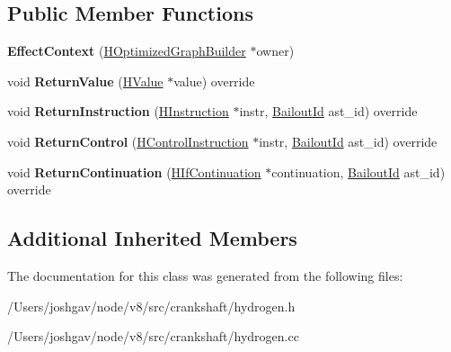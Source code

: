 \subsection*{Public Member Functions}
\begin{DoxyCompactItemize}
\item 
{\bfseries Effect\+Context} (\hyperlink{classv8_1_1internal_1_1_h_optimized_graph_builder}{H\+Optimized\+Graph\+Builder} $\ast$owner)\hypertarget{classv8_1_1internal_1_1_effect_context_aaf67bb6bbb84cbec46dd1d3e621864ed}{}\label{classv8_1_1internal_1_1_effect_context_aaf67bb6bbb84cbec46dd1d3e621864ed}

\item 
void {\bfseries Return\+Value} (\hyperlink{classv8_1_1internal_1_1_h_value}{H\+Value} $\ast$value) override\hypertarget{classv8_1_1internal_1_1_effect_context_a8bfa0667ee2f87add85ba129d06aed73}{}\label{classv8_1_1internal_1_1_effect_context_a8bfa0667ee2f87add85ba129d06aed73}

\item 
void {\bfseries Return\+Instruction} (\hyperlink{classv8_1_1internal_1_1_h_instruction}{H\+Instruction} $\ast$instr, \hyperlink{classv8_1_1internal_1_1_bailout_id}{Bailout\+Id} ast\+\_\+id) override\hypertarget{classv8_1_1internal_1_1_effect_context_a5b67c5fdcf330817fd813adac4245250}{}\label{classv8_1_1internal_1_1_effect_context_a5b67c5fdcf330817fd813adac4245250}

\item 
void {\bfseries Return\+Control} (\hyperlink{classv8_1_1internal_1_1_h_control_instruction}{H\+Control\+Instruction} $\ast$instr, \hyperlink{classv8_1_1internal_1_1_bailout_id}{Bailout\+Id} ast\+\_\+id) override\hypertarget{classv8_1_1internal_1_1_effect_context_a6dc5fda1ffff8de8cb39afb13df888e4}{}\label{classv8_1_1internal_1_1_effect_context_a6dc5fda1ffff8de8cb39afb13df888e4}

\item 
void {\bfseries Return\+Continuation} (\hyperlink{classv8_1_1internal_1_1_h_if_continuation}{H\+If\+Continuation} $\ast$continuation, \hyperlink{classv8_1_1internal_1_1_bailout_id}{Bailout\+Id} ast\+\_\+id) override\hypertarget{classv8_1_1internal_1_1_effect_context_a152a77d8d163f575bc48d0809790fe30}{}\label{classv8_1_1internal_1_1_effect_context_a152a77d8d163f575bc48d0809790fe30}

\end{DoxyCompactItemize}
\subsection*{Additional Inherited Members}


The documentation for this class was generated from the following files\+:\begin{DoxyCompactItemize}
\item 
/\+Users/joshgav/node/v8/src/crankshaft/hydrogen.\+h\item 
/\+Users/joshgav/node/v8/src/crankshaft/hydrogen.\+cc\end{DoxyCompactItemize}
